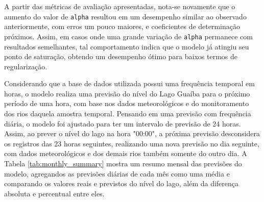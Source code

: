 A partir das métricas de avaliação apresentadas, nota-se novamente que o aumento do valor de \texttt{alpha} resultou em um desempenho similar ao observado anteriormente, com erros um pouco maiores, e coeficientes de determinação próximos. Assim, em casos onde uma grande variação de \texttt{alpha} permanece com resultados semelhantes, tal comportamento indica que o modelo já atingiu seu ponto de saturação, obtendo um desempenho ótimo para baixos termos de regularização.

Considerando que a base de dados utilizada possui uma frequência temporal em horas, o modelo realiza uma previsão do nível do Lago Guaíba para o próximo período de uma hora, com base nos dados meteorológicos e do monitoramento dos rios daquela amostra temporal. Pensando em uma previsão com frequência diária, o modelo foi ajustado para ter um intervalo de previsão de 24 horas. Assim, ao prever o nível do lago na hora "00:00", a próxima previsão desconsidera os registros das 23 horas seguintes, realizando uma nova previsão no dia seguinte, com dados meteorológicos e dos demais rios também somente do outro dia. A Tabela \ref{tab:monthly_summary} mostra um resumo mensal das previsões do modelo, agregandos as previsões diárias de cada mês como uma média e comparando os valores reais e previstos do nível do lago, além da diferença absoluta e percentual entre eles.


